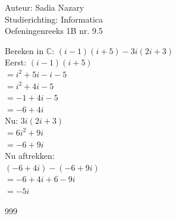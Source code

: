 \documentclass[a4paper]{article}
\begin{document}
  
\noindent \large Auteur: Sadia Nazary  \\
\noindent \large Studierichting: Informatica\\
\noindent \large Oefeningenreeks 1B nr. 9.5\\

\medskip

\normalsize

Bereken in $\mathbb{C}$: $(i-1)(i+5) - 3i(2i+3)$\\

Eerst: $(i-1)(i+5)$\\

$= i^2 + 5i - i - 5$\\

$= i^2 + 4i - 5$\\

$= -1 + 4i - 5$\\

$= -6 + 4i$\\

Nu: $3i(2i+3)$\\

$= 6i^2 + 9i$\\

$= -6 + 9i$\\

Nu aftrekken:\\

$(-6 + 4i) - (-6 + 9i)$\\

$= -6 + 4i + 6 - 9i$\\

$= -5i$

\begin{thebibliography}{999}
\end{thebibliography}
\end{document}

